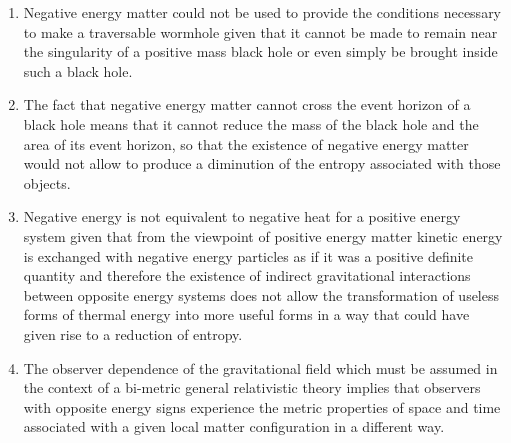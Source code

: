 \documentclass[notitlepage,12pt]{report}
\begin{document}
\begin{enumerate}
\item Negative energy matter could not be used to provide the conditions necessary to make a traversable wormhole given that it cannot be made to remain near the singularity of a positive mass black hole or even simply be brought inside such a black hole.

\item The fact that negative energy matter cannot cross the event horizon of a black hole means that it cannot reduce the mass of the black hole and the area of its event horizon, so that the existence of negative energy matter would not allow to produce a diminution of the entropy associated with those objects.

\item Negative energy is not equivalent to negative heat for a positive energy system given that from the viewpoint of positive energy matter kinetic energy is exchanged with negative energy particles as if it was a positive definite quantity and therefore the existence of indirect gravitational interactions between opposite energy systems does not allow the transformation of useless forms of thermal energy into more useful forms in a way that could have given rise to a reduction of entropy.

\item The observer dependence of the gravitational field which must be assumed in the context of a bi-metric general relativistic theory implies that observers with opposite energy signs experience the metric properties of space and time associated with a given local matter configuration in a different way.


\end{enumerate}
\end{document}
